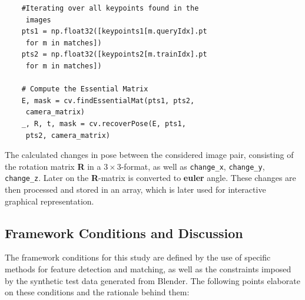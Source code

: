 \documentclass[conference, a4paper]{IEEEtran}
\begin{document}
\begingroup
\fontsize{8}{10}\selectfont
\begin{verbatim}
	#Iterating over all keypoints found in the
	 images
	pts1 = np.float32([keypoints1[m.queryIdx].pt
	 for m in matches])
	pts2 = np.float32([keypoints2[m.trainIdx].pt
	 for m in matches])
	
	# Compute the Essential Matrix
	E, mask = cv.findEssentialMat(pts1, pts2,
	 camera_matrix)	
	_, R, t, mask = cv.recoverPose(E, pts1,
	 pts2, camera_matrix)
\end{verbatim}
\endgroup

The calculated changes in pose between the considered image pair, consisting of the rotation matrix \textbf{R} in a $3 \times 3$-format, as well as \texttt{change\_x}, \texttt{change\_y}, \texttt{change\_z}. Later on the \textbf{R}-matrix is converted to \textbf{euler} angle. These changes are then processed and stored in an array, which is later used for interactive graphical representation.

\subsection{Framework Conditions and Discussion}

The framework conditions for this study are defined by the use of specific methods for feature detection and matching, as well as the constraints imposed by the synthetic test data generated from Blender. The following points elaborate on these conditions and the rationale behind them:
\end{document}
